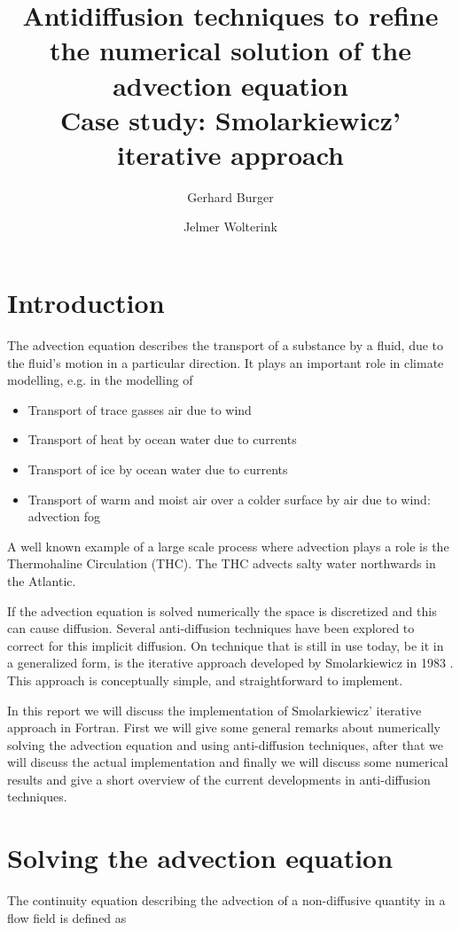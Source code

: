 \documentclass[10pt, a4paper]{article}
\author{Gerhard Burger \and Jelmer Wolterink}
\title{Antidiffusion techniques to refine the numerical solution of the advection equation\\ Case study: Smolarkiewicz' iterative approach}
\begin{document}
\maketitle

\section{Introduction}
The advection equation describes the transport of a substance by a fluid, due to the fluid's motion in a particular direction. It plays an important role in climate modelling, e.g. in the modelling of 
\begin{itemize}
   \item Transport of trace gasses air due to wind
   \item Transport of heat by ocean water due to currents
   \item Transport of ice by ocean water due to currents
   \item Transport of warm and moist air over a colder surface by air due to wind: advection fog
\end{itemize}

A well known example of a large scale process where advection plays a role is the Thermohaline Circulation (THC). The THC advects salty water northwards in the Atlantic.

If the advection equation is solved numerically the space is discretized and this can cause diffusion. Several anti-diffusion techniques have been explored to correct for this implicit diffusion. On technique that is still in use today, be it in a generalized form, is the iterative approach developed by Smolarkiewicz in 1983 \cite{smolarki}. This approach is conceptually simple, and straightforward to implement.

In this report we will discuss the implementation of Smolarkiewicz' iterative approach in Fortran. First we will give some general remarks about numerically solving the advection equation and using anti-diffusion techniques, after that we will discuss the actual implementation and finally we will discuss some numerical results and give a short overview of the current developments in anti-diffusion techniques.

\section{Solving the advection equation}
\label{sec:solvadveq}
The continuity equation describing the advection of a non-diffusive quantity in a flow field is defined as
\end{document}
